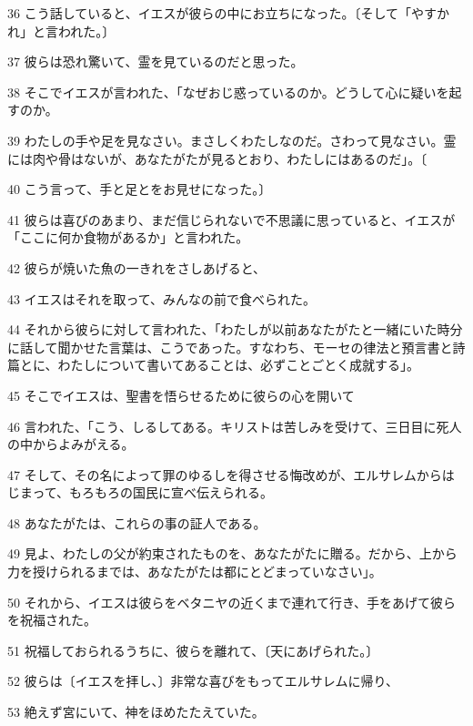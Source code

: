 \par 36 こう話していると、イエスが彼らの中にお立ちになった。〔そして「やすかれ」と言われた。〕
\par 37 彼らは恐れ驚いて、霊を見ているのだと思った。
\par 38 そこでイエスが言われた、「なぜおじ惑っているのか。どうして心に疑いを起すのか。
\par 39 わたしの手や足を見なさい。まさしくわたしなのだ。さわって見なさい。霊には肉や骨はないが、あなたがたが見るとおり、わたしにはあるのだ」。〔
\par 40 こう言って、手と足とをお見せになった。〕
\par 41 彼らは喜びのあまり、まだ信じられないで不思議に思っていると、イエスが「ここに何か食物があるか」と言われた。
\par 42 彼らが焼いた魚の一きれをさしあげると、
\par 43 イエスはそれを取って、みんなの前で食べられた。
\par 44 それから彼らに対して言われた、「わたしが以前あなたがたと一緒にいた時分に話して聞かせた言葉は、こうであった。すなわち、モーセの律法と預言書と詩篇とに、わたしについて書いてあることは、必ずことごとく成就する」。
\par 45 そこでイエスは、聖書を悟らせるために彼らの心を開いて
\par 46 言われた、「こう、しるしてある。キリストは苦しみを受けて、三日目に死人の中からよみがえる。
\par 47 そして、その名によって罪のゆるしを得させる悔改めが、エルサレムからはじまって、もろもろの国民に宣べ伝えられる。
\par 48 あなたがたは、これらの事の証人である。
\par 49 見よ、わたしの父が約束されたものを、あなたがたに贈る。だから、上から力を授けられるまでは、あなたがたは都にとどまっていなさい」。
\par 50 それから、イエスは彼らをベタニヤの近くまで連れて行き、手をあげて彼らを祝福された。
\par 51 祝福しておられるうちに、彼らを離れて、〔天にあげられた。〕
\par 52 彼らは〔イエスを拝し、〕非常な喜びをもってエルサレムに帰り、
\par 53 絶えず宮にいて、神をほめたたえていた。


